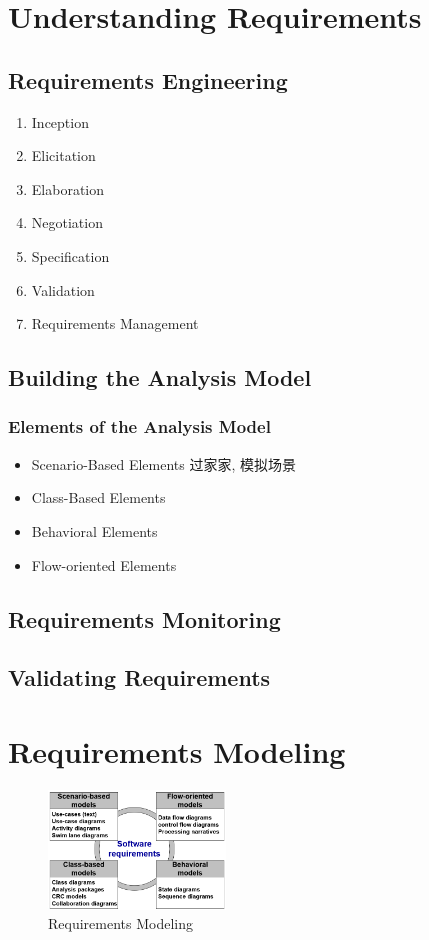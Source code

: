 \newpage
\section{Understanding Requirements}
\subsection{Requirements Engineering}
\begin{enumerate}
    \item Inception
    \item Elicitation
    \item Elaboration
    \item Negotiation
    \item Specification
    \item Validation
    \item Requirements Management
\end{enumerate}

\subsection{Building the Analysis Model}
\subsubsection{Elements of the Analysis Model}
\begin{itemize}
    \item Scenario-Based Elements
    \subitem 过家家, 模拟场景
    \item Class-Based Elements
    \item Behavioral Elements
    \item Flow-oriented Elements
\end{itemize}

\subsection{Requirements Monitoring}

\subsection{Validating Requirements}

\section{Requirements Modeling}
\begin{figure}[!htb]
    \centering
    \includegraphics[width=0.42\textwidth]{pic/SE4/Requirements Modeling}
    \caption{Requirements Modeling}
\end{figure}

